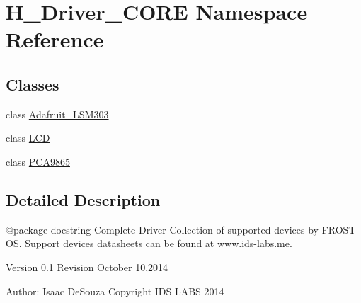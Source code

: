 \hypertarget{namespaceH__Driver__CORE}{}\section{H\+\_\+\+Driver\+\_\+\+C\+O\+R\+E Namespace Reference}
\label{namespaceH__Driver__CORE}
\subsection*{Classes}
\begin{DoxyCompactItemize}
\item 
class \hyperlink{classH__Driver__CORE_1_1Adafruit__LSM303}{Adafruit\+\_\+\+L\+S\+M303}
\item 
class \hyperlink{classH__Driver__CORE_1_1LCD}{L\+C\+D}
\item 
class \hyperlink{classH__Driver__CORE_1_1PCA9865}{P\+C\+A9865}
\end{DoxyCompactItemize}


\subsection{Detailed Description}
\begin{DoxyVerb}@package docstring
Complete Driver Collection of supported devices by FROST OS. Support devices datasheets can be found at www.ids-labs.me.

Version 0.1
Revision October 10,2014

Author: Isaac DeSouza
Copyright IDS LABS 2014
\end{DoxyVerb}
 